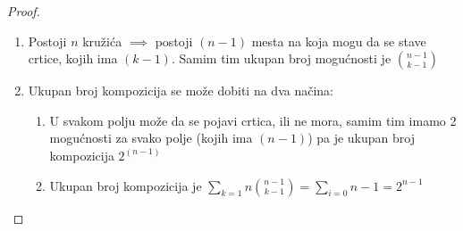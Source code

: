 \begin{proof}
	\begin{enumerate}
		\item
			Postoji $n$ kružića $\implies$ postoji $(n-1)$ mesta na koja mogu da se stave crtice, kojih ima $(k-1)$. Samim tim ukupan broj mogućnosti je $\binom{n-1}{k-1}$ 
		\item
			Ukupan broj kompozicija se može dobiti na dva načina:
			\begin{enumerate}[label = \alph*)]
				\item 
					U svakom polju može da se pojavi crtica, ili ne mora, samim tim imamo 2 mogućnosti za svako polje (kojih ima $(n-1)$) pa je ukupan broj kompozicija $2^{(n-1)}$
				\item
					Ukupan broj kompozicija je $\sum_{k=1}{n} \binom{n-1}{k-1} = \sum_{i=0}{n-1} = 2^{n-1}$
			\end{enumerate}
	\end{enumerate}
\end{proof}